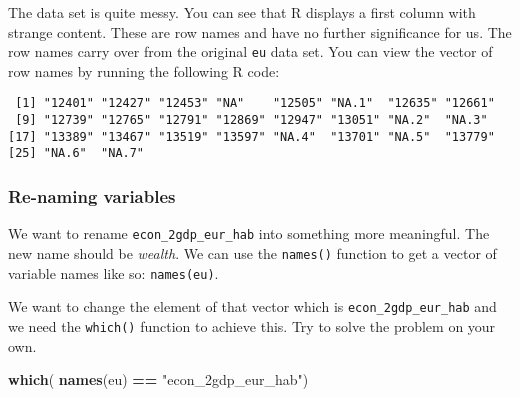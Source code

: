 \documentclass[]{article}
\newenvironment{Shaded}{\begin{snugshade}}{\end{snugshade}}
\newcommand{\DecValTok}[1]{\textcolor[rgb]{0.00,0.00,0.81}{#1}}
\newcommand{\KeywordTok}[1]{\textcolor[rgb]{0.13,0.29,0.53}{\textbf{#1}}}
\newcommand{\NormalTok}[1]{#1}
\newcommand{\OperatorTok}[1]{\textcolor[rgb]{0.81,0.36,0.00}{\textbf{#1}}}
\newcommand{\StringTok}[1]{\textcolor[rgb]{0.31,0.60,0.02}{#1}}
\begin{document}
The data set is quite messy. You can see that R displays a first column with strange content. These are row names and have no further significance for us. The row names carry over from the original \texttt{eu} data set. You can view the vector of row names by running the following R code:

\begin{Shaded}
\end{Shaded}

\begin{verbatim}
 [1] "12401" "12427" "12453" "NA"    "12505" "NA.1"  "12635" "12661"
 [9] "12739" "12765" "12791" "12869" "12947" "13051" "NA.2"  "NA.3" 
[17] "13389" "13467" "13519" "13597" "NA.4"  "13701" "NA.5"  "13779"
[25] "NA.6"  "NA.7" 
\end{verbatim}

\hypertarget{re-naming-variables}{%
\subsubsection{Re-naming variables}\label{re-naming-variables}}

We want to rename \texttt{econ\_2gdp\_eur\_hab} into something more meaningful. The new name should be \emph{wealth}. We can use the \texttt{names()} function to get a vector of variable names like so: \texttt{names(eu)}.

We want to change the element of that vector which is \texttt{econ\_2gdp\_eur\_hab} and we need the \texttt{which()} function to achieve this. Try to solve the problem on your own.

\begin{Shaded}
\begin{Highlighting}[]
\KeywordTok{which}\NormalTok{( }\KeywordTok{names}\NormalTok{(eu) }\OperatorTok{==}\StringTok{  "econ_2gdp_eur_hab"}\NormalTok{)}
\end{Highlighting}
\end{Shaded}
\end{document}
